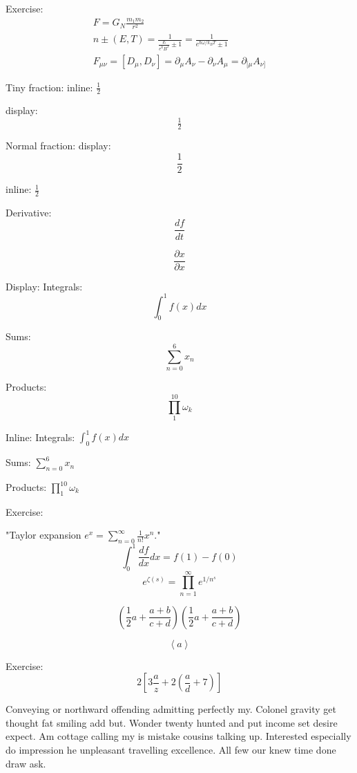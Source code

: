 \documentclass[letterpaper, notitlepage, 12pt]{article}
\begin{document}
Exercise:
\begin{equation}
\begin{split}
F=G_N\frac{m_1m_2}{r^2}\\
n\pm(E,T)=\frac{1}{\frac{E}{e^kB^T}\pm1}=\frac{1}{e^{\hbar\omega/k_BT}\pm1}\\
F_{\mu\nu}=[D_\mu,D_\nu]=\partial_{\mu}A_\nu-\partial_{\nu}A_\mu=\partial_{[\mu}A_{\nu]}
\end{split}
\end{equation}

Tiny fraction:
inline:
\(\tfrac12\)

display:
\[\tfrac12\]

Normal fraction:
display:
\[\frac12\]

inline:
\(\frac12\)

Derivative:
\[
\frac{df}{dt}
\]

\[
\frac{\partial x}{\partial x}
\]

Display:
Integrals:
\[
\int_0^1 f(x) dx
\]

Sums:
\[
\sum_{n=0}^6 x_n
\]

Products:
\[
\prod_1^{10} \omega_k
\]

Inline:
Integrals:
\(
\int_0^1 f(x) dx
\)

Sums:
\(
\sum_{n=0}^6 x_n
\)

Products:
\(
\prod_1^{10} \omega_k
\)

Exercise:

"Taylor expansion \(e^x=\sum_{n=0}^\infty \frac{1}{n!}x^n\)."
\[
\int_0^1 \frac{df}{dx}dx=f(1)-f(0)
\]
\[
e^{\zeta(s)}=\prod_{n=1}^\infty e^{1/n^s}
\]

\[
\left(\frac12 a+\frac{a+b}{c+d} \right)
(\frac12a+\frac{a+b}{c+d})
\]

\[
\left\langle a \right\rangle
\]

Exercise:
\[
2 \left[3\frac{a}{z}+2 \left(\frac{a}{d}+7\right)\right]
\]

Conveying or northward offending admitting perfectly my. Colonel gravity get thought fat smiling add but. Wonder twenty hunted and put income set desire expect. Am cottage calling my is mistake cousins talking up. Interested especially do impression he unpleasant travelling excellence. All few our knew time done draw ask.  
\end{document}

